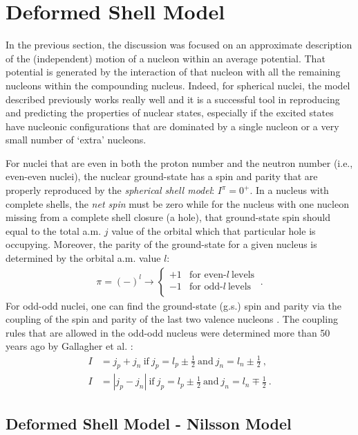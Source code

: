 \section{Deformed Shell Model}

In the previous section, the discussion was focused on an approximate description of the (independent) motion of a nucleon within an average potential. That potential is generated by the interaction of that nucleon with all the remaining nucleons within the compounding nucleus. Indeed, for spherical nuclei, the model described previously works really well and it is a successful tool in reproducing and predicting the properties of nuclear states, especially if the excited states have nucleonic configurations that are dominated by a single nucleon or a very small number of `extra' nucleons.

For nuclei that are even in both the proton number and the neutron number (i.e., even-even nuclei), the nuclear ground-state has a spin and parity that are properly reproduced by the \emph{spherical shell model}: $I^\pi=0^+$. In a nucleus with complete shells, the \emph{net spin} must be zero while for the nucleus with one nucleon missing from a complete shell closure (a hole), that ground-state spin should equal to the total a.m. $j$ value of the orbital which that particular hole is occupying. Moreover, the parity of the ground-state for a given nucleus is determined by the orbital a.m. value $l$:
\begin{align}\pi=(-)^l\to
    \begin{cases}
        +1 &\text{for even-}l\ \text{levels}\\
        -1 &\text{for odd-}l\ \text{levels}\\
   \end{cases}\ .
\end{align}
For odd-odd nuclei, one can find the ground-state (g.s.) spin and parity via the coupling of the spin and parity of the last two valence nucleons \cite{krane1991introductory,bertulani2007nuclear}. The coupling rules that are allowed in the odd-odd nucleus were determined more than 50 years ago by Gallagher et al. \cite{gallagher1958coupling}:
\begin{align}
    I&=j_p+j_n\ \text{if}\ j_p=l_p\pm\frac{1}{2}\ \text{and}\ j_n=l_n\pm\frac{1}{2}\ ,\\
    I&=|j_p-j_n|\ \text{if}\ j_p=l_p\pm\frac{1}{2}\ \text{and}\ j_n=l_n\mp\frac{1}{2}\ .
\end{align}

\subsection{Deformed Shell Model - Nilsson Model}

